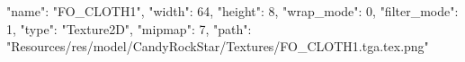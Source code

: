 {
  "name": "FO_CLOTH1",
  "width": 64,
  "height": 8,
  "wrap_mode": 0,
  "filter_mode": 1,
  "type": "Texture2D",
  "mipmap": 7,
  "path": "Resources/res/model/CandyRockStar/Textures/FO_CLOTH1.tga.tex.png"
}